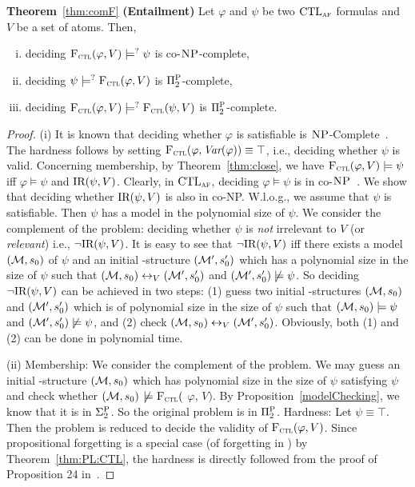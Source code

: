 \documentclass{article}
\begin{document}
\noindent\textbf{Theorem}~\ref{thm:comF} \textbf{(Entailment)} Let $\varphi$ and $\psi$ be two $\textrm{CTL}_{\textsc{a} \textsc{f}}$ formulas and $V$ be a set of atoms. Then,
\begin{enumerate}[(i)]
  \item deciding  ${\textsc{F}_{\textsc{ctl}}}(\varphi, V ) \models^? \psi$ is co-$\textsc{NP}$-complete,
  \item deciding  $\psi \models^? {\textsc{F}_{\textsc{ctl}}}(\varphi, V)$ is $\Pi_2^{\textsc{P}}$-complete,
  \item deciding ${\textsc{F}_{\textsc{ctl}}}(\varphi, V) \models^? {\textsc{F}_{\textsc{ctl}}}(\psi, V)$ is $\Pi_2^{\textsc{P}}$-complete.
\end{enumerate}
\begin{proof}
(i) It is known that deciding whether $\varphi$ is satisfiable is $\textsc{NP}$-Complete~\cite{meier2009complexity}. The hardness follows by setting ${\textsc{F}_{\textsc{ctl}}}(\varphi, \textit{Var}(\varphi))\equiv \top$, i.e., deciding whether $\psi$ is valid.
Concerning membership, by Theorem~\ref{thm:close}, we have ${\textsc{F}_{\textsc{ctl}}}(\varphi, V ) \models \psi$ iff $\varphi \models \psi$ and $\textrm{IR}(\psi, V)$.
Clearly, in $\textrm{CTL}_{\textsc{a} \textsc{f}}$, deciding $\varphi\models \psi$ is in co-$\textsc{NP}$~\cite{meier2009complexity}. We show that deciding whether $\textrm{IR}(\psi, V )$ is also
in co-NP. W.l.o.g., we assume that $\psi$ is satisfiable.
 Then $\psi$ has a model in the polynomial size of $\psi$.
 We consider the complement of the problem: deciding whether $\psi$ is \emph{not} irrelevant to $V$ (or \emph{relevant}) i.e., $\neg \textrm{IR}(\psi, V)$. It is easy to see that $\neg \textrm{IR}(\psi, V)$ iff there exists a model $({\cal M}, s_0)$ of $\psi$ and an
initial \MPK-structure $({\cal M}',s_0')$ which has a polynomial size in the size of $\psi$ such that
$({\cal M}, s_0) \leftrightarrow_V ({\cal M}',s_0')$ and $({\cal M}',s_0')\not \models \psi$. So deciding $\neg \textrm{IR}(\psi, V)$ can be achieved in two steps: (1) guess two initial \MPK-structures $({\cal M},s_0)$ and $({\cal M}',s_0')$ which is of polynomial size   in the size of $\psi$ such that $({\cal M},s_0) \models \psi$ and $({\cal M}',s_0')\not \models \psi$, and (2) check
$({\cal M}, s_0) \leftrightarrow_V ({\cal M}',s_0')$. Obviously, both (1) and (2) can be done in polynomial time.

(ii) Membership: We consider the complement of the
problem. We may guess an initial \MPK-structure $({\cal M}, s_0)$ which has  polynomial size in the size of $\psi$ satisfying $\psi$ and check whether $({\cal M},s_0)$ $\not \models {\textsc{F}_{\textsc{ctl}}}($ $\varphi$, $V)$. By Proposition~\ref{modelChecking}, we know that it is in $\Sigma_2^{\textsc{P}}$. So the original problem is in $\Pi_2^{\textsc{P}}$. Hardness: Let $\psi \equiv \top$. Then the problem is reduced to decide the validity of  ${\textsc{F}_{\textsc{ctl}}}(\varphi, V )$. Since propositional forgetting is a special case (of forgetting in \CTL) by Theorem~\ref{thm:PL:CTL}, the hardness is directly followed from the proof of Proposition 24 in~\cite{DBLP:journals/jair/LangLM03}.


\end{proof}
\end{document}
